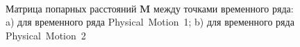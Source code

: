 \documentclass[12pt, twoside]{article}
\numberwithin{equation}{section}
\begin{document}
\begin{figure}[h!t]\center
{}
\\
\caption{Матрица попарных расстояний $\textbf{M}$ между точками временного ряда: a) для временного ряда Physical~Motion~1; b) для временного ряда Physical~Motion~2}
\label{fig_real_distance}
\end{figure}
\end{document}
